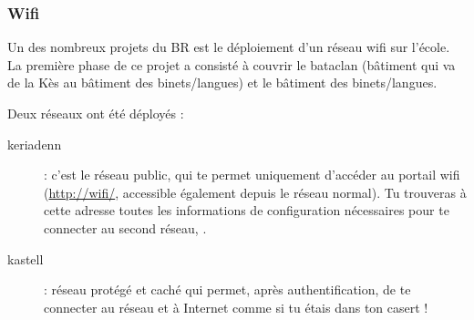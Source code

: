 \subsubsection{Wifi}
\label{wifi} Un des nombreux projets du BR est le déploiement d'un
réseau wifi sur l'école. La première phase de ce projet a consisté à
couvrir le bataclan (bâtiment qui va de la Kès au bâtiment des
binets/langues) et le bâtiment des binets/langues.

Deux réseaux ont été déployés :

\begin{description}
  \item[keriadenn] : c'est le réseau public, qui te permet uniquement d'accéder au portail wifi (\url{http://wifi/}, accessible également depuis le réseau normal). Tu trouveras à cette adresse toutes les informations de configuration nécessaires pour te connecter au second réseau, .

  \item[kastell] : réseau protégé et caché qui permet, après authentification, de te connecter au réseau et à Internet comme si tu étais dans ton casert !
\end{description}

